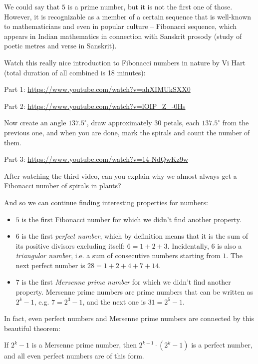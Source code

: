 We could say that $5$ is a prime number, but it is not the first one of those. However, it is recognizable as a member of a certain sequence that is well-known to mathematicians and even in popular culture -- Fibonacci sequence, which appears in Indian mathematics in connection with Sanskrit prosody (study of poetic metres and verse in Sanskrit).

\begin{exercise}
    Watch this really nice introduction to Fibonacci numbers in nature by Vi Hart (total duration of all combined is 18 minutes):
    
    Part 1: \url{https://www.youtube.com/watch?v=ahXIMUkSXX0}
    
    Part 2:
    \url{https://www.youtube.com/watch?v=lOIP_Z_-0Hs}
    
    Now create an angle $137.5^\circ$, draw approximately $30$ petals, each $137.5^\circ$ from the previous one, and when you are done, mark the spirals and count the number of them. 
    
    Part 3: \url{https://www.youtube.com/watch?v=14-NdQwKz9w}
    
    After watching the third video, can you explain why we almost always get a Fibonacci number of spirals in plants? 
\end{exercise} 
    
And so we can continue finding interesting properties for numbers:
\begin{itemize}
\item $5$ is the first Fibonacci number for which we didn't find another property.
\item $6$ is the first \emph{perfect number}, which by definition means that it is the sum of its positive divisors excluding itself: $6 = 1+2+3$. Incidentally, $6$ is also a \emph{triangular number}, i.e. a sum of consecutive numbers starting from $1$. The next perfect number is $28 = 1 + 2 + 4 + 7 + 14$. 
\item $7$ is the first \emph{Mersenne prime number} for which we didn't find another property. Mersenne prime numbers are prime numbers that can be written as $2^k - 1$, e.g. $7 = 2^3 - 1$, and the next one is $31 = 2^5 - 1$.
\end{itemize}

In fact, even perfect numbers and Mersenne prime numbers are connected by this beautiful theorem:
\begin{theorem}
If $2^k-1$ is a Mersenne prime number, then $2^{k-1} \cdot (2^k - 1)$ is a perfect number, and all even perfect numbers are of this form.
\end{theorem}

